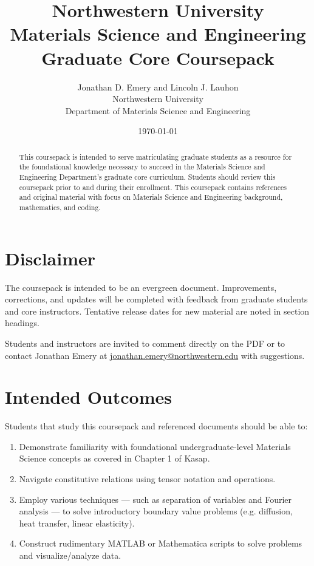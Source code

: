 \documentclass[11pt]{article}
\title{Northwestern University
\\Materials Science and Engineering
\\Graduate Core Coursepack}
\date{\today}
\author{Jonathan D. Emery and Lincoln J. Lauhon
\\Northwestern University 
\\Department of Materials Science and Engineering}
\begin{document}
\maketitle

\vspace{4em}
\begin{abstract}
\noindent This coursepack is intended to serve matriculating graduate students as a resource for the foundational knowledge necessary to succeed in the Materials Science and Engineering Department's graduate core curriculum. Students should review this coursepack prior to and during their enrollment. This coursepack contains references and original material with focus on Materials Science and Engineering background, mathematics, and coding. 

\end{abstract}
\newpage

\section*{Disclaimer}
The coursepack is intended to be an evergreen document. Improvements, corrections, and updates will be completed with feedback from graduate students and core instructors. Tentative release dates for new material are noted in section headings. 

Students and instructors are invited to comment directly on the PDF or to contact Jonathan Emery at \href{mailto:jonathan.emery@northwestern.edu}{jonathan.emery@northwestern.edu} with suggestions.

\section*{Intended Outcomes}
Students that study this coursepack and referenced documents should be able to:

\begin{enumerate}
	\item Demonstrate familiarity with foundational undergraduate-level Materials Science concepts as covered in Chapter 1 of Kasap\cite{kasap2006principles}.
	\item Navigate constitutive relations using tensor notation and operations.
	\item Employ various techniques --- such as separation of variables and Fourier analysis --- to solve introductory boundary value problems (e.g. diffusion, heat transfer, linear elasticity).
	\item Construct rudimentary MATLAB or Mathematica scripts to solve problems and visualize/analyze data.
\end{enumerate}
\end{document}

